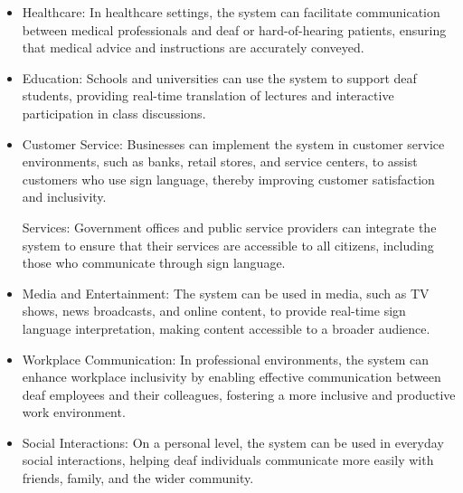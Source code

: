 \begin{itemize}
    \item Healthcare:
   In healthcare settings, the system can facilitate communication between medical professionals and deaf or hard-of-hearing patients, ensuring that medical advice and instructions are accurately conveyed.


    \item Education:
   Schools and universities can use the system to support deaf students, providing real-time translation of lectures and interactive participation in class discussions.


    \item  Customer Service:
   Businesses can implement the system in customer service environments, such as banks, retail stores, and service centers, to assist customers who use sign language, thereby improving customer satisfaction and inclusivity.



    \itemPublic Services:
   Government offices and public service providers can integrate the system to ensure that their services are accessible to all citizens, including those who communicate through sign language.

   \item Media and Entertainment:
   The system can be used in media, such as TV shows, news broadcasts, and online content, to provide real-time sign language interpretation, making content accessible to a broader audience.


   \item Workplace Communication:
   In professional environments, the system can enhance workplace inclusivity by enabling effective communication between deaf employees and their colleagues, fostering a more inclusive and productive work environment.

   \item Social Interactions:
   On a personal level, the system can be used in everyday social interactions, helping deaf individuals communicate more easily with friends, family, and the wider community.



    \end{itemize}

